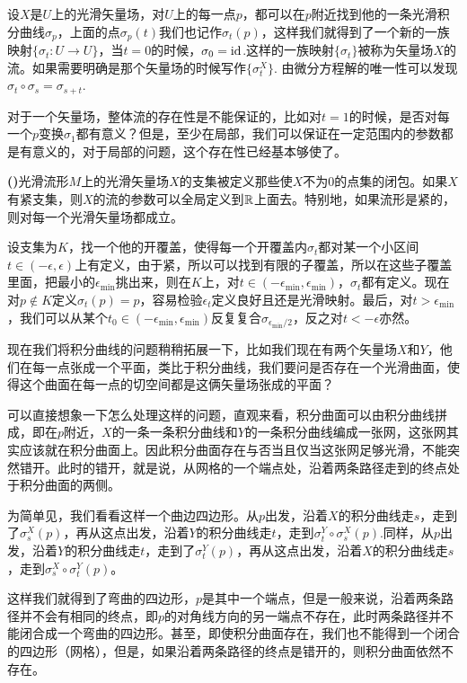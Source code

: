 \documentclass[9pt]{extbook}
\newcommand{\paracount}[1]{\refstepcounter{para}\textbf{#1 (\thepara)}}
\renewcommand{\para}{\paracount{}}
\begin{document}
设$X$是$U$上的光滑矢量场，对$U$上的每一点$p$，都可以在$p$附近找到他的一条光滑积分曲线$\sigma_p$，上面的点$\sigma_p(t)$我们也记作$\sigma_t(p)$，这样我们就得到了一个新的一族映射$\{\sigma_t:U\to U\}$，当$t=0$的时候，$\sigma_0=\operatorname{id}$.这样的一族映射$\{\sigma_t\}$被称为矢量场$X$的流。如果需要明确是那个矢量场的时候写作$\{\sigma^X_t\}$. 由微分方程解的唯一性可以发现$\sigma_t\circ \sigma_s=\sigma_{s+t}$.

对于一个矢量场，整体流的存在性是不能保证的，比如对$t=1$的时候，是否对每一个$p$变换$\sigma_1$都有意义？但是，至少在局部，我们可以保证在一定范围内的参数都是有意义的，对于局部的问题，这个存在性已经基本够使了。

\para 光滑流形$M$上的光滑矢量场$X$的支集被定义那些使$X$不为$0$的点集的闭包。如果$X$有紧支集，则$X$的流的参数可以全局定义到$\mathbb{R}$上面去。特别地，如果流形是紧的，则对每一个光滑矢量场都成立。

设支集为$K$，找一个他的开覆盖，使得每一个开覆盖内$\sigma_t$都对某一个小区间$t\in (-\epsilon,\epsilon)$上有定义，由于紧，所以可以找到有限的子覆盖，所以在这些子覆盖里面，把最小的$\epsilon_{\text{min}}$挑出来，则在$K$上，对$t\in(-\epsilon_{\text{min}},\epsilon_{\text{min}})$，$\sigma_t$都有定义。现在对$p\notin K$定义$\sigma_t(p)=p$，容易检验$\epsilon_t$定义良好且还是光滑映射。最后，对$t>\epsilon_{\text{min}}$，我们可以从某个$t_0\in (-\epsilon_{\text{min}},\epsilon_{\text{min}})$反复复合$\sigma_{\epsilon_{\text{min}}/2}$，反之对$t<-\epsilon$亦然。

现在我们将积分曲线的问题稍稍拓展一下，比如我们现在有两个矢量场$X$和$Y$，他们在每一点张成一个平面，类比于积分曲线，我们要问是否存在一个光滑曲面，使得这个曲面在每一点的切空间都是这俩矢量场张成的平面？

可以直接想象一下怎么处理这样的问题，直观来看，积分曲面可以由积分曲线拼成，即在$p$附近，$X$的一条一条积分曲线和$Y$的一条积分曲线编成一张网，这张网其实应该就在积分曲面上。因此积分曲面存在与否当且仅当这张网足够光滑，不能突然错开。此时的错开，就是说，从网格的一个端点处，沿着两条路径走到的终点处于积分曲面的两侧。

为简单见，我们看看这样一个曲边四边形。从$p$出发，沿着$X$的积分曲线走$s$，走到了$\sigma^X_s(p)$，再从这点出发，沿着$Y$的积分曲线走$t$，走到$\sigma^Y_t\circ\sigma^X_s(p)$.同样，从$p$出发，沿着$Y$的积分曲线走$t$，走到了$\sigma^Y_t(p)$，再从这点出发，沿着$X$的积分曲线走$s$，走到$\sigma^X_s\circ\sigma^Y_t(p)$。

这样我们就得到了弯曲的四边形，$p$是其中一个端点，但是一般来说，沿着两条路径并不会有相同的终点，即$p$的对角线方向的另一端点不存在，此时两条路径并不能闭合成一个弯曲的四边形。甚至，即使积分曲面存在，我们也不能得到一个闭合的四边形（网格），但是，如果沿着两条路径的终点是错开的，则积分曲面依然不存在。
\end{document}
